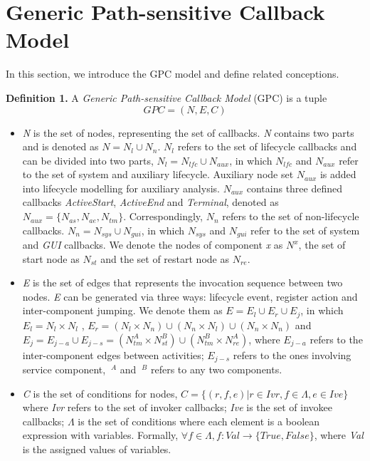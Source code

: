 \section{Generic Path-sensitive Callback Model}\label{transition-model}
In this section, we introduce the GPC model and define related conceptions. 

\textbf{Definition 1.} A \textit{Generic Path-sensitive Callback Model} (GPC) is a tuple
\begin{equation}
GPC = (N, E, C)
\end{equation}
\begin{itemize}
\item \textit{N} is the set of nodes, representing the set of callbacks. \textit{N} contains two parts and is denoted as $ N = N_{l}\cup N_{n}$.  $ N_{l}$ refers to the set of lifecycle callbacks and can be divided into two parts, $N_{l}= N_{lfc}\cup N_{aux}$, in which $N_{lfc}$ and $N_{aux}$ refer to the set of system and auxiliary lifecycle. Auxiliary node set $N_{aux}$ is added into lifecycle modelling for auxiliary analysis. $N_{aux}$ contains three defined callbacks \textit{ActiveStart}, \textit{ActiveEnd} and \textit{Terminal}, denoted as $N_{aux} = \{N_{as}, N_{ae}, N_{tm} \} $. Correspondingly, $N_{n}$ refers to the set of non-lifecycle callbacks. $N_{n} = N_{sys}\cup N_{gui}$, in which $N_{sys}$ and $N_{gui}$ refer to the set of system and \textit{GUI} callbacks. We denote the nodes of component \textit{x} as $N^{x}$, the set of start node as $N_{st}$ and the set of restart node as $N_{re}$. 
\item \textit{E} is the set of edges that represents the invocation sequence between two nodes. \textit{E} can be generated via three ways: lifecycle event, register action and inter-component jumping. We denote them as $E = E_{l}\cup E_{r}\cup E_{j}$, in which $ E_{l} = N_{l} \times N_{l}$ , $ E_{r}  = (N_{l} \times N_{n}) \cup (N_{n} \times N_{l}) \cup (N_{n} \times N_{n})$ and $ E_{j} = E_{j-a}\cup E_{j-s} = (N_{tm}^{A} \times N_{st}^{B}) \cup (N_{tm}^{B}\times N_{re}^{A})$, where $E_{j-a}$ refers to the inter-component edges between activities; $E_{j-s}$ refers to the ones involving service component, $~^A$ and $~^B$ refers to any two components.
\item \textit{C} is the set of conditions for nodes, $C = \{( r, f, e )| r\in Ivr, f\in \Lambda, e\in Ive\}$ where \textit{Ivr} refers to the set of invoker callbacks; \textit{Ive} is the set of invokee callbacks; $\Lambda$ is the set of conditions where each element is a boolean expression with variables. Formally, $\forall f\in \Lambda, f : Val \rightarrow \{True, False\}$, where \textit{Val} is the assigned values of variables.
\end{itemize}

